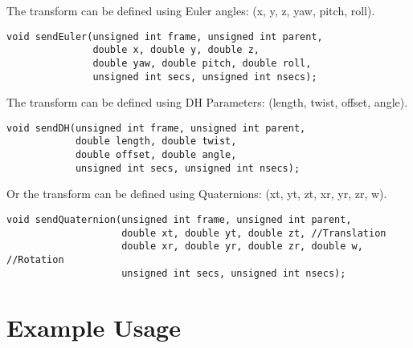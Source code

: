 \documentclass[12pt]{article}
\begin{document}
The transform can be defined using Euler angles: (x, y, z, yaw, pitch, roll).
\begin{verbatim}
void sendEuler(unsigned int frame, unsigned int parent, 
               double x, double y, double z, 
               double yaw, double pitch, double roll,
               unsigned int secs, unsigned int nsecs);
\end{verbatim}

The transform can be defined using DH Parameters: (length, twist, offset, angle).
\begin{verbatim}
void sendDH(unsigned int frame, unsigned int parent, 
            double length, double twist, 
            double offset, double angle, 
            unsigned int secs, unsigned int nsecs);
\end{verbatim}

Or the transform can be defined using Quaternions: (xt, yt, zt, xr, yr, zr, w).
\begin{verbatim}
void sendQuaternion(unsigned int frame, unsigned int parent, 
                    double xt, double yt, double zt, //Translation
                    double xr, double yr, double zr, double w, //Rotation
                    unsigned int secs, unsigned int nsecs);
\end{verbatim}

\section{Example Usage}
\end{document}

